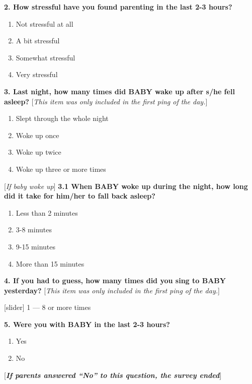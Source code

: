 \documentclass[
]{article}
\providecommand{\tightlist}{%
  \setlength{\itemsep}{0pt}\setlength{\parskip}{0pt}}
\begin{document}
\textbf{2. How stressful have you found parenting in the last 2-3
hours?}

\begin{enumerate}
\def\labelenumi{\alph{enumi}.}
\tightlist
\item
  Not stressful at all
\item
  A bit stressful
\item
  Somewhat stressful
\item
  Very stressful
\end{enumerate}

\textbf{3. Last night, how many times did BABY wake up after s/he fell
asleep?} {[}\emph{This item was only included in the first ping of the
day.}{]}

\begin{enumerate}
\def\labelenumi{\alph{enumi}.}
\tightlist
\item
  Slept through the whole night
\item
  Woke up once
\item
  Woke up twice
\item
  Woke up three or more times
\end{enumerate}

{[}\emph{If baby woke up}{]} \textbf{3.1 When BABY woke up during the
night, how long did it take for him/her to fall back asleep?}

\begin{enumerate}
\def\labelenumi{\alph{enumi}.}
\tightlist
\item
  Less than 2 minutes
\item
  3-8 minutes
\item
  9-15 minutes
\item
  More than 15 minutes
\end{enumerate}

\textbf{4. If you had to guess, how many times did you sing to BABY
yesterday?} {[}\emph{This item was only included in the first ping of
the day.}{]}

{[}slider{]} 1 --- 8 or more times

\textbf{5. Were you with BABY in the last 2-3 hours?}

\begin{enumerate}
\def\labelenumi{\alph{enumi}.}
\tightlist
\item
  Yes
\item
  No
\end{enumerate}

{[}\textbf{\emph{If parents answered ``No'' to this question, the survey
ended}}{]}
\end{document}
